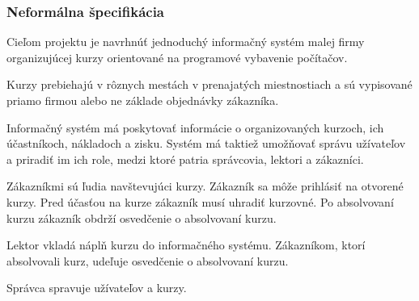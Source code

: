\documentclass[12pt,a4paper,titlepage,final]{report}
\begin{document}
	\def\authora{Michal Riša}
	\def\authorb{Pavel Macenauer}
	\def\emaila{xrisam01@stud.fit.vutbr.cz}
	\def\emailb{xmacen02@stud.fit.vutbr.cz}
	\def\docname{Firma2}
	\def\projname{Prvotná analýza a plán projektu}
	
	\newpage
	\pagestyle{plain}
	\setcounter{page}{1}
	\subsubsection{Neformálna špecifikácia}
Cieľom projektu je navrhnúť jednoduchý informačný systém malej firmy organizujúcej kurzy orientované na programové vybavenie počítačov.

Kurzy prebiehajú v rôznych mestách v prenajatých miestnostiach a sú vypisované priamo firmou alebo ne základe objednávky zákazníka.

Informačný systém má poskytovať informácie o organizovaných kurzoch, ich účastníkoch, nákladoch a zisku. Systém má taktiež umožňovať správu užívateľov a priradiť im ich role, medzi ktoré patria správcovia, lektori a zákazníci.

Zákazníkmi sú ľudia navštevujúci kurzy. Zákazník sa môže prihlásiť na otvorené kurzy. Pred účasťou na kurze zákazník musí uhradiť kurzovné. Po absolvovaní kurzu zákazník obdrží osvedčenie o absolvovaní kurzu.

Lektor vkladá náplň kurzu do informačného systému. Zákazníkom, ktorí absolvovali kurz, udeľuje osvedčenie o absolvovaní kurzu.

Správca spravuje užívateľov a kurzy.
\end{document}
